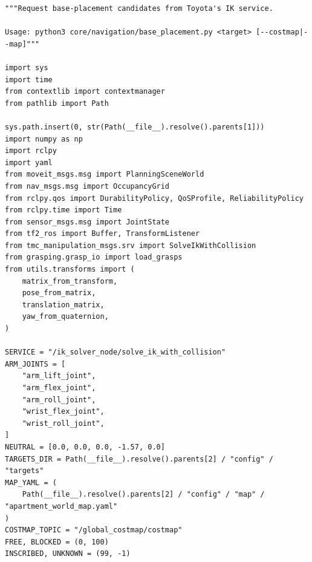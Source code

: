\documentclass[11pt,a4paper]{book}
\begin{document}
\begin{lstlisting}[firstnumber=1]
"""Request base-placement candidates from Toyota's IK service.

Usage: python3 core/navigation/base_placement.py <target> [--costmap|--map]"""

import sys
import time
from contextlib import contextmanager
from pathlib import Path

sys.path.insert(0, str(Path(__file__).resolve().parents[1]))
import numpy as np
import rclpy
import yaml
from moveit_msgs.msg import PlanningSceneWorld
from nav_msgs.msg import OccupancyGrid
from rclpy.qos import DurabilityPolicy, QoSProfile, ReliabilityPolicy
from rclpy.time import Time
from sensor_msgs.msg import JointState
from tf2_ros import Buffer, TransformListener
from tmc_manipulation_msgs.srv import SolveIkWithCollision
from grasping.grasp_io import load_grasps
from utils.transforms import (
    matrix_from_transform,
    pose_from_matrix,
    translation_matrix,
    yaw_from_quaternion,
)

SERVICE = "/ik_solver_node/solve_ik_with_collision"
ARM_JOINTS = [
    "arm_lift_joint",
    "arm_flex_joint",
    "arm_roll_joint",
    "wrist_flex_joint",
    "wrist_roll_joint",
]
NEUTRAL = [0.0, 0.0, 0.0, -1.57, 0.0]
TARGETS_DIR = Path(__file__).resolve().parents[2] / "config" / "targets"
MAP_YAML = (
    Path(__file__).resolve().parents[2] / "config" / "map" / "apartment_world_map.yaml"
)
COSTMAP_TOPIC = "/global_costmap/costmap"
FREE, BLOCKED = (0, 100)
INSCRIBED, UNKNOWN = (99, -1)


\end{lstlisting}
\end{document}

